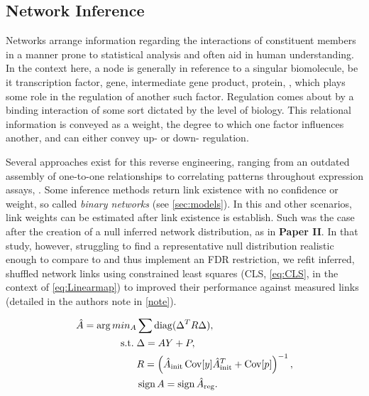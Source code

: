 \subsection{Network Inference}
\label{sec:netinf}
Networks arrange information regarding the interactions of constituent members in a manner prone to statistical analysis and often aid in human understanding. In the context here, a node is generally in reference to a singular biomolecule, be it transcription factor, gene, intermediate gene product, protein, \etc, which plays some role in the regulation of another such factor. Regulation comes about by a binding interaction of some sort dictated by the level of biology. This relational information is conveyed as a weight, the degree to which one factor influences another, and can either convey up- or down- regulation.

Several approaches exist for this reverse engineering, ranging from an outdated assembly of one-to-one relationships to correlating patterns throughout expression assays, \etc. Some inference methods return link existence with no confidence or weight, so called \emph{binary networks} (see \cref{sec:models}). In this and other scenarios, link weights can be estimated after link existence is establish. Such was the case after the creation of a null inferred network distribution, as in \textbf{Paper II}. In that study, however, struggling to find a representative null distribution realistic enough to compare to and thus implement an FDR restriction, we refit inferred, shuffled network links using constrained least squares (CLS, \cref{eq:CLS}, \citep{grant2008cvx} in the context of \cref{eq:Linearmap}) to improved their performance against measured links (detailed in the authors note in \cref{note}). 


\begin{equation}%
\begin{aligned}\label{eq:CLS}
  \hat{A} = \arg min_{A} & \sum \diag(\Delta^TR \Delta), \\
  \text{s.t.}\; & \Delta = A Y + P, \\
  & R = \left( \hat{A}_{\textrm{init}} \Cov[y] \hat{A}_{\textrm{init}}^{T} + \Cov[p]\right)^{-1},\\ %
  & \sign{A} = \sign{\hat{A}_{\textrm{reg}}}. \\
\end{aligned}
\end{equation}

